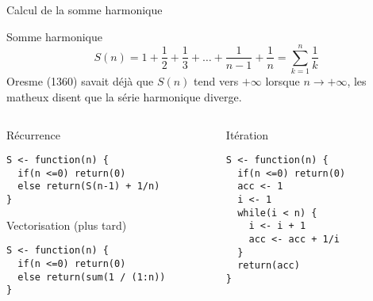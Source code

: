 \documentclass[10pt]{beamer}
\begin{document}
 
\begin{frame}[fragile]{Calcul de la somme harmonique}

  \begin{block}{Somme harmonique}
    $$
    S(n) = 1 + \frac{1}{2} + \frac{1}{3} + \ldots + \frac{1}{n-1} + \frac{1}{n}
    = \sum_{k=1}^n \frac{1}{k}
    $$
    Oresme (1360) savait déjà que $S(n)$ tend vers $+\infty$ lorsque $n \rightarrow +\infty$, les matheux disent que la série harmonique diverge.
  \end{block}

  
\begin{columns}[t]
\begin{column}{0.48\textwidth}
  \begin{block}{Récurrence}
    \begin{lstlisting}[style=edblock]
S <- function(n) {      
  if(n <=0) return(0)
  else return(S(n-1) + 1/n)
}  
\end{lstlisting}
\end{block}
\begin{block}{Vectorisation (plus tard)}
    \begin{lstlisting}[style=edblock]
S <- function(n) {
  if(n <=0) return(0)
  else return(sum(1 / (1:n))
}  
\end{lstlisting}
  \end{block}

\end{column}
\begin{column}{0.48\textwidth}
  \begin{block}{Itération}
    \begin{lstlisting}[style=edblock]
S <- function(n) {      
  if(n <=0) return(0)
  acc <- 1
  i <- 1
  while(i < n) {
    i <- i + 1
    acc <- acc + 1/i
  }
  return(acc)
}  
\end{lstlisting}
  \end{block}
\end{column}
\end{columns}
\end{frame}



\end{document}
